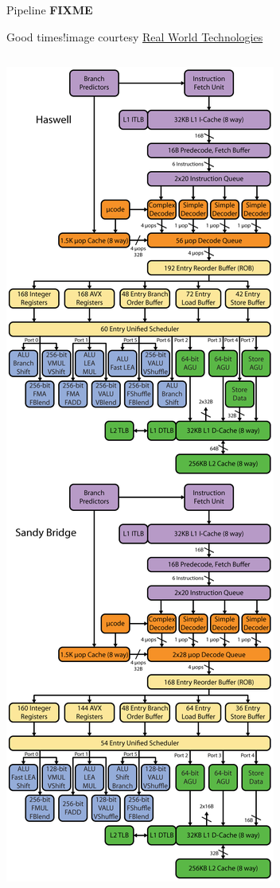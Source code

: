 \documentclass[mathserif,xcolor={dvipsnames,table}]{beamer}
\begin{document}
\begin{frame}{Pipeline}
\huge\textbf{FIXME}
\end{frame}

\begin{frame}{Good times!\hfill\tiny{image courtesy \href{http://realworldtech.com}{Real World Technologies}}}
\begin{columns}
\begin{column}{.5\textwidth}
\includegraphics[scale=.225]{images/haswell-5.png}
\end{column}
\end{columns}
\end{frame}
\end{document}
